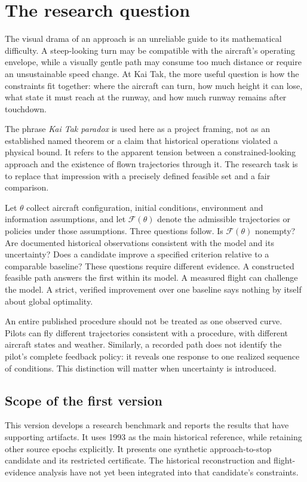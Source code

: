 \section{The research question}
\label{sec:question}
The visual drama of an approach is an unreliable guide to its mathematical difficulty. A steep-looking turn may be compatible with the aircraft's operating envelope, while a visually gentle path may consume too much distance or require an unsustainable speed change. At Kai Tak, the more useful question is how the constraints fit together: where the aircraft can turn, how much height it can lose, what state it must reach at the runway, and how much runway remains after touchdown.

The phrase \emph{Kai Tak paradox} is used here as a project framing, not as an established named theorem or a claim that historical operations violated a physical bound. It refers to the apparent tension between a constrained-looking approach and the existence of flown trajectories through it. The research task is to replace that impression with a precisely defined feasible set and a fair comparison.

Let $\theta$ collect aircraft configuration, initial conditions, environment and information assumptions, and let $\mathcal F(\theta)$ denote the admissible trajectories or policies under those assumptions. Three questions follow. Is $\mathcal F(\theta)$ nonempty? Are documented historical observations consistent with the model and its uncertainty? Does a candidate improve a specified criterion relative to a comparable baseline? These questions require different evidence. A constructed feasible path answers the first within its model. A measured flight can challenge the model. A strict, verified improvement over one baseline says nothing by itself about global optimality.

An entire published procedure should not be treated as one observed curve. Pilots can fly different trajectories consistent with a procedure, with different aircraft states and weather. Similarly, a recorded path does not identify the pilot's complete feedback policy: it reveals one response to one realized sequence of conditions. This distinction will matter when uncertainty is introduced.

\subsection{Scope of the first version}
This version develops a research benchmark and reports the results that have supporting artifacts. It uses 1993 as the main historical reference, while retaining other source epochs explicitly. It presents one synthetic approach-to-stop candidate and its restricted certificate. The historical reconstruction and flight-evidence analysis have not yet been integrated into that candidate's constraints.

